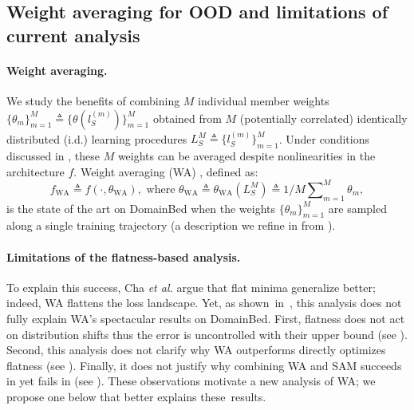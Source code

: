 \subsection{Weight averaging for OOD and limitations of current analysis}%
\label{sec:limithessian}%
\paragraph{Weight averaging.}%
We study the benefits of combining $M$ individual member weights $\{\theta_m\}_{m=1}^M \triangleq \{\theta(l_S^{(m)})\}_{m=1}^M$ obtained from $M$ (potentially correlated) identically distributed (i.d.) learning procedures $L_S^M\triangleq\{l_S^{(m)}\}_{m=1}^M$.
Under conditions discussed in , these $M$ weights can be averaged despite nonlinearities in the architecture $f$.
Weight averaging (WA) \cite{izmailov2018}, defined as:
\begin{equation} \label{eq:f_wa}
    f_{\text{WA}} \triangleq f(\cdot, \theta_{\text{WA}}), \text{~where~} \theta_{\text{WA}}\triangleq\theta_{\text{WA}}(L_S^M) \triangleq 1/M \sum\nolimits_{m=1}^{M} \theta_m,%
\end{equation}
is the state of the art \cite{cha2021wad,arpit2021ensemble} on DomainBed \cite{gulrajani2021in} when the weights $\{\theta_m\}_{m=1}^M$ are sampled along a single training trajectory (a description we refine in  from ).
\paragraph{Limitations of the flatness-based analysis.}
To explain this success, Cha \textit{et al.} \cite{cha2021wad} argue that flat minima generalize better; indeed, WA flattens the loss landscape.
Yet, as shown~in~, this analysis does not fully explain WA's spectacular results on DomainBed.
First, flatness does not act on distribution shifts thus the \ood error is uncontrolled with their upper bound (see ).
Second, this analysis does not clarify why WA outperforms  directly optimizes flatness (see ).
Finally, it does not justify why combining WA and SAM succeeds in \iid \cite{questionsflatminima22} yet fails in \ood (see ).
These observations motivate a new analysis of WA; we propose one below that better explains these~results. %

